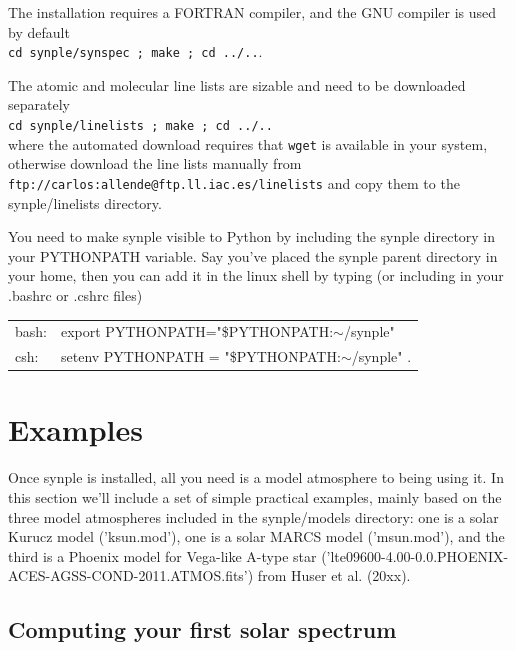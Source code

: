 \documentclass[]{article}
\begin{document}
The installation requires a FORTRAN compiler, and the GNU compiler is used by default
\\ {\tt cd synple/synspec ; make ; cd ../..}.

The atomic and molecular line lists are sizable and need to be downloaded separately
\\ {\tt cd synple/linelists ; make ; cd ../..} \\
\noindent where the automated download requires that {\tt wget} is available in your system, otherwise download the line lists manually from \\ {\tt ftp://carlos:allende@ftp.ll.iac.es/linelists} and copy them to the synple/linelists directory.

You need to make synple visible to Python by including the synple directory in your PYTHONPATH variable. Say you've placed the synple parent directory in your home, then you can add it in the linux shell by typing (or including in your .bashrc or .cshrc files)
\begin{table}
\begin{tabular}{ll}
bash: & export PYTHONPATH="\$PYTHONPATH:$\sim$/synple"  \\
csh:  & setenv PYTHONPATH = "\$PYTHONPATH:$\sim$/synple" .
\end{tabular}
\end{table}




\section{Examples}

Once synple is installed, all you need is a model atmosphere to being using it. In this section we'll include a set of simple practical examples, mainly based on the three model atmospheres included in the synple/models directory: one is a solar Kurucz model ('ksun.mod'), one is a solar MARCS model ('msun.mod'), and the third is a Phoenix model for Vega-like A-type star ('lte09600-4.00-0.0.PHOENIX-ACES-AGSS-COND-2011.ATMOS.fits') from Huser et al. (20xx).


\subsection{Computing your first solar spectrum}
\label{6162}
\end{document}
